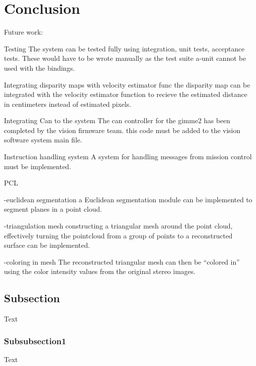 \section{Conclusion}\label{sec:conclusion}
Future work:


Testing
The system can be tested fully using integration, unit tests, acceptance tests. These would have to be wrote manually as the test suite a-unit cannot be used with the bindings.

Integrating disparity maps with velocity estimator func
the disparity map can be integrated with the velocity estimator function to recieve the estimated distance in centimeters instead of estimated pixels.

Integrating Can to the system
The can controller for the gimme2 has been completed by the vision firmware team. this code must be added to the vision software system main file.

Instruction handling system
A system for handling messages from mission control must be implemented.

PCL

-euclidean segmentation
a Euclidean segmentation module can be implemented to segment planes in a point cloud. 

-triangulation mesh
constructing a triangular mesh around the point cloud, effectively turning the pointcloud from a group of points to a reconstructed surface can be implemented.

-coloring in mesh
The reconstructed triangular mesh can then be “colored in” using the color intensity values from the original stereo images.


\subsection{Subsection}
Text
\subsubsection{Subsubsection1}
Text
